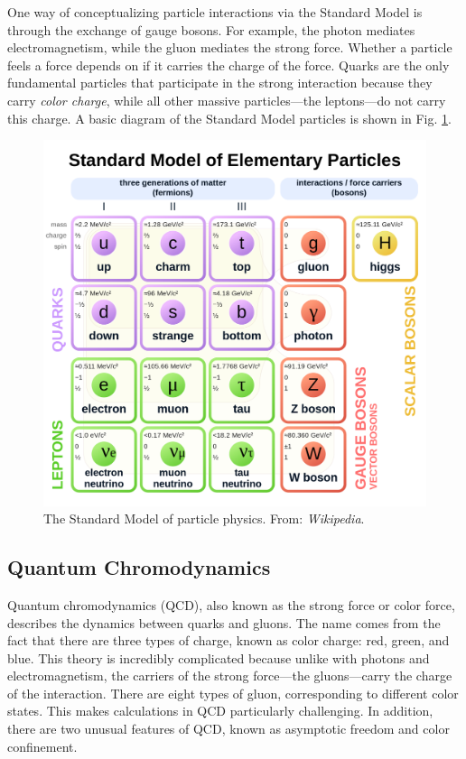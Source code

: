 \documentclass[../main.tex]{subfiles}
\begin{document}
One way of conceptualizing particle interactions via the Standard Model is through the exchange of gauge bosons. For example, the photon mediates electromagnetism, while the gluon mediates the strong force. Whether a particle feels a force depends on if it carries the charge of the force. Quarks are the only fundamental particles that participate in the strong interaction because they carry \textit{color charge}, while all other massive particles---the leptons---do not carry this charge. A basic diagram of the Standard Model particles is shown in Fig. \ref{fig:standard_model}.

\begin{figure}[h]
    \centering
    \includegraphics[scale=0.2]{introduction/figs/standardmodel.png}
    \caption{The Standard Model of particle physics. From: \textit{Wikipedia}.}
    \label{fig:standard_model}
\end{figure}


\subsection{Quantum Chromodynamics}
Quantum chromodynamics (QCD), also known as the strong force or color force, describes the dynamics between quarks and gluons. The name comes from the fact that there are three types of charge, known as color charge: red, green, and blue. This theory is incredibly complicated because unlike with photons and electromagnetism, the carriers of the strong force---the gluons---carry the charge of the interaction. There are eight types of gluon, corresponding to different color states. This makes calculations in QCD particularly challenging. In addition, there are two unusual features of QCD, known as asymptotic freedom and color confinement. 
\end{document}
